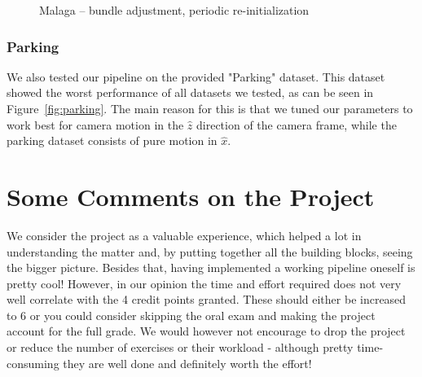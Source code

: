 \documentclass[11pt]{article}
\newlength\figureheight
\newlength\figurewidth
\begin{document}
\begin{figure}[h]
	\centering
	\setlength\figureheight{6cm} 
	\setlength\figurewidth{8cm}
	
	\caption{Malaga -- bundle adjustment, periodic re-initialization}
	\label{fig:malaga_BA_reinit}
\end{figure}

\subsubsection{Parking}
We also tested our pipeline on the provided "Parking" dataset. This dataset showed the worst performance of all datasets we tested, as can be seen in Figure~\ref{fig:parking}. The main reason for this is that we tuned our parameters to work best for camera motion in the $\hat{z}$ direction of the camera frame, while the parking dataset consists of pure motion in $\hat{x}$.


\section*{Some Comments on the Project}
We consider the project as a valuable experience, which helped a lot in understanding the matter and, by putting together all the building blocks, seeing the bigger picture. Besides that, having implemented a working pipeline oneself is pretty cool! However, in our opinion the time and effort required does not very well correlate with the 4 credit points granted. These should either be increased to 6 or you could consider skipping the oral exam and making the project account for the full grade. We would however not encourage to drop the project or reduce the number of exercises or their workload - although pretty time-consuming they are well done and definitely worth the effort!


\begin{comment}
\begin{figure}[h]
	\centering
	\setlength\figureheight{10cm} 
	\setlength\figurewidth{15cm}
	
	\caption{Kitti entire BA no reinit thin}
	\label{fig:Kitti_entire_BA_no_reinit_thin}
\end{figure}
\end{comment}
\end{document}

